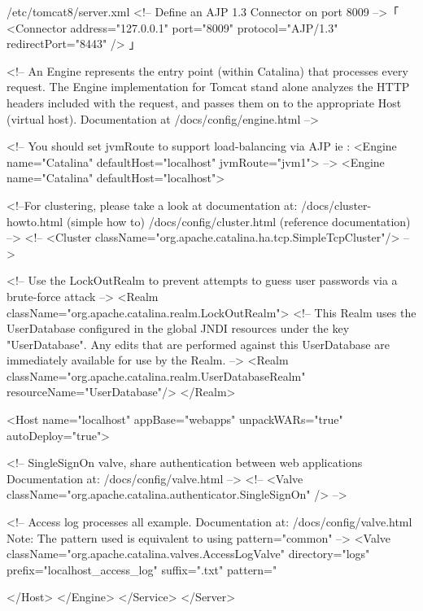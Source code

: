 \documentclass{tarentanleitung}
\begin{document}
\begin{lstdump}[basicstyle=\ttfamily\footnotesize]{/etc/tomcat8/server.xml}
    <!-- Define an AJP 1.3 Connector on port 8009 -->「
    <Connector address="127.0.0.1" port="8009" protocol="AJP/1.3" redirectPort="8443" />
」

    <!-- An Engine represents the entry point (within Catalina) that processes
         every request.  The Engine implementation for Tomcat stand alone
         analyzes the HTTP headers included with the request, and passes them
         on to the appropriate Host (virtual host).
         Documentation at /docs/config/engine.html -->

    <!-- You should set jvmRoute to support load-balancing via AJP ie :
    <Engine name="Catalina" defaultHost="localhost" jvmRoute="jvm1">
    -->
    <Engine name="Catalina" defaultHost="localhost">

      <!--For clustering, please take a look at documentation at:
          /docs/cluster-howto.html  (simple how to)
          /docs/config/cluster.html (reference documentation) -->
      <!--
      <Cluster className="org.apache.catalina.ha.tcp.SimpleTcpCluster"/>
      -->

      <!-- Use the LockOutRealm to prevent attempts to guess user passwords
           via a brute-force attack -->
      <Realm className="org.apache.catalina.realm.LockOutRealm">
        <!-- This Realm uses the UserDatabase configured in the global JNDI
             resources under the key "UserDatabase".  Any edits
             that are performed against this UserDatabase are immediately
             available for use by the Realm.  -->
        <Realm className="org.apache.catalina.realm.UserDatabaseRealm"
               resourceName="UserDatabase"/>
      </Realm>

      <Host name="localhost"  appBase="webapps"
            unpackWARs="true" autoDeploy="true">

        <!-- SingleSignOn valve, share authentication between web applications
             Documentation at: /docs/config/valve.html -->
        <!--
        <Valve className="org.apache.catalina.authenticator.SingleSignOn" />
        -->

        <!-- Access log processes all example.
             Documentation at: /docs/config/valve.html
             Note: The pattern used is equivalent to using pattern="common" -->
        <Valve className="org.apache.catalina.valves.AccessLogValve" directory="logs"
               prefix="localhost_access_log" suffix=".txt"
               pattern="%

      </Host>
    </Engine>
  </Service>
</Server>
\end{lstdump}
\end{document}

